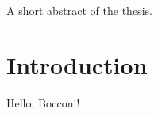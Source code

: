 \documentclass[university=bocconi, bachelor, simil_frontpages=true, language=english, twoside]{academicthesis}
\begin{document}
\frontpage

\frontmatter
\begin{abstractthesis}
  A short abstract of the thesis.
\end{abstractthesis}

\tableofcontents

\mainmatter
\chapter{Introduction}
Hello, Bocconi!
\end{document}
